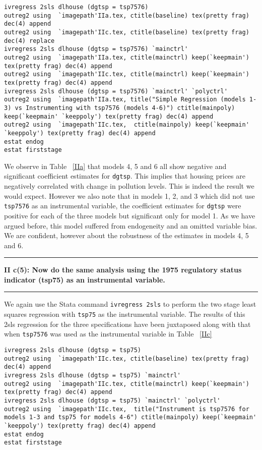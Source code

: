 \documentclass[12pt]{article}
\newcommand\question[2]{\vspace{1em}\hrule\vspace{1em}\textbf{#1: #2}\vspace{1em}\hrule\vspace{1em}}
\begin{document}
\begin{lstlisting}
ivregress 2sls dlhouse (dgtsp = tsp7576)
outreg2 using  `imagepath'IIa.tex, ctitle(baseline) tex(pretty frag) dec(4) append
outreg2 using  `imagepath'IIc.tex, ctitle(baseline) tex(pretty frag) dec(4) replace
ivregress 2sls dlhouse (dgtsp = tsp7576) `mainctrl'
outreg2 using  `imagepath'IIa.tex, ctitle(mainctrl) keep(`keepmain') tex(pretty frag) dec(4) append
outreg2 using  `imagepath'IIc.tex, ctitle(mainctrl) keep(`keepmain')  tex(pretty frag) dec(4) append
ivregress 2sls dlhouse (dgtsp = tsp7576) `mainctrl' `polyctrl'
outreg2 using  `imagepath'IIa.tex, title("Simple Regression (models 1-3) vs Instrumenting with tsp7576 (models 4-6)") ctitle(mainpoly) keep(`keepmain' `keeppoly') tex(pretty frag) dec(4) append
outreg2 using  `imagepath'IIc.tex,  ctitle(mainpoly) keep(`keepmain' `keeppoly') tex(pretty frag) dec(4) append
estat endog
estat firststage
\end{lstlisting}

We observe in Table ~\ref{IIa} that models 4, 5 and 6 all show negative and significant coefficient estimates for \verb|dgtsp|. This implies that housing prices are negatively correlated with change in pollution levels. This is indeed the result we would expect. However we also note that in models 1, 2, and 3 which did not use \verb|tsp7576| as an instrumental variable, the coefficient estimates for  \verb|dgtsp| were positive for each of the three models but significant only for model 1. As we have argued before, this model suffered from endogeneity and an omitted variable bias. We are confident, however about the robustness of the estimates in models 4, 5 and 6.

\question{II c(5)}{Now do the same analysis using the 1975 regulatory status indicator (tsp75) as an instrumental variable. }
We again use the Stata command \verb|ivregress 2sls| to perform the two stage least squares regression with \verb|tsp75| as the instrumental variable. The results of this 2sls regression for the three specifications have been juxtaposed along with that when \verb|tsp7576| was used as the instrumental variable in Table ~\ref{IIc}
\begin{table}
\caption{}

\label{IIc}
\end{table}

\begin{lstlisting}
ivregress 2sls dlhouse (dgtsp = tsp75)
outreg2 using  `imagepath'IIc.tex, ctitle(baseline) tex(pretty frag) dec(4) append
ivregress 2sls dlhouse (dgtsp = tsp75) `mainctrl'
outreg2 using  `imagepath'IIc.tex, ctitle(mainctrl) keep(`keepmain') tex(pretty frag) dec(4) append
ivregress 2sls dlhouse (dgtsp = tsp75) `mainctrl' `polyctrl'
outreg2 using  `imagepath'IIc.tex,  title("Instrument is tsp7576 for models 1-3 and tsp75 for models 4-6") ctitle(mainpoly) keep(`keepmain' `keeppoly') tex(pretty frag) dec(4) append
estat endog
estat firststage
\end{lstlisting}
\end{document}
